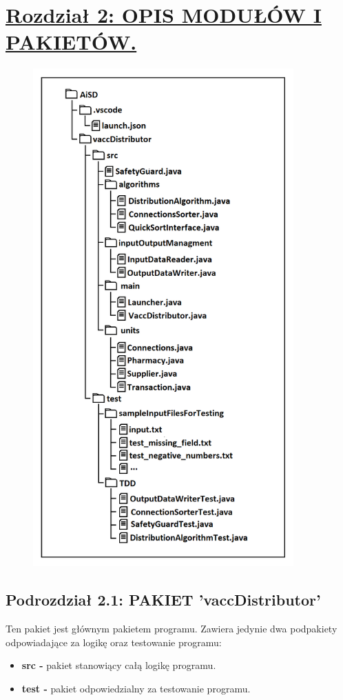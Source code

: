 \documentclass[a4paper]{article}
\begin{document}
\section*{\underline{Rozdział 2: OPIS MODUŁÓW I PAKIETÓW.}}
\begin{figure}[H]
    \includegraphics[width=10cm]{Katalogi.png}
    \centering
\end{figure}
\newpage

\subsection*{Podrozdział 2.1: PAKIET 'vaccDistributor'}
Ten pakiet jest głównym pakietem programu. Zawiera jedynie dwa podpakiety odpowiadające za logikę oraz testowanie programu:
\begin{itemize}
\item \textbf{src -} pakiet stanowiący całą logikę programu. 
\item \textbf{test -} pakiet odpowiedzialny za testowanie programu.
\end{itemize}
\end{document}
